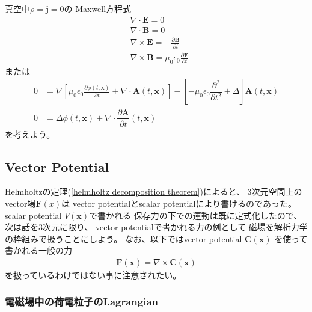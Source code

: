 真空中$\rho = \bm{j} = 0$の
Maxwell方程式
\begin{subequations}
\begin{align}
  &\nabla \cdot \bm{E}
=
  0
\\
  &\nabla \cdot \bm{B}
= 0
\\
  &\nabla \times \bm{E}
=
  - \frac{\partial \bm{B}}
    {\partial t}
\\
  &\nabla \times \bm{B}
=
  \mu_0 \epsilon_0
    \frac{\partial \bm{E}}
      {\partial t}
\end{align}
\end{subequations}
または
\begin{subequations}
\begin{align}
  0
&=
  \nabla
  \left[
    \mu_0 \epsilon_0
    \frac{\partial \phi (t, \bm{x})}
      {\partial t}
  +
    \nabla \cdot
      \bm{A} (t, \bm{x})
  \right]
  -
  \left[
    - \mu_0 \epsilon_0
    \dfrac{\partial^2}{\partial t^2}
  +
    \Delta
  \right]
    \bm{A} (t, \bm{x})
\\
  0
&=
    \Delta \phi (t, \bm{x})
  +
    \nabla \cdot
    \dfrac{\partial \bm{A}}
      {\partial t} (t, \bm{x})
\end{align}
\end{subequations}
を考えよう。

\subsection{Vector Potential}

Helmholtzの定理(\ref{helmholtz decomposition theorem})によると、
$3$次元空間上のvector場$\bm{F}(x)$は
vector potentialとscalar potentialにより書けるのであった。
scalar potential $V(\bm{x})$で書かれる
保存力の下での運動は既に定式化したので、
次は話を$3$次元に限り、
vector potentialで書かれる力の例として
磁場を解析力学の枠組みで扱うことにしよう。
なお、以下ではvector potential
$\bm{C}(\bm{x})$
を使って書かれる一般の力
\begin{align}
  \bm{F}(\bm{x}) = \nabla \times \bm{C}(\bm{x})
\end{align}
を扱っているわけではない事に注意されたい。

\subsubsection{電磁場中の荷電粒子のLagrangian}

